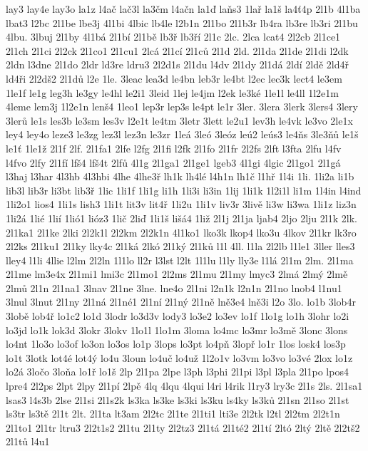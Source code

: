 lay3
lay4e
lay3o
la1z
l4ač
lač3l
la3čm
l4ačn
la1ď
laňs3
1lař
la1š
la4ť4p
2l1b
4l1ba
lbat3
l2bc
2l1be
lbe3j
4l1bi
4lbic
lb4le
l2b1n
2l1bo
2l1b3r
lb4ra
lb3re
lb3ri
2l1bu
4lbu.
3lbuj
2l1by
4l1bá
2l1bí
2l1bě
lb3ř
lb3ří
2l1c
2lc.
2lca
lcat4
2l2cb
2l1ce1
2l1ch
2l1ci
2l2ck
2l1co1
2l1cu1
2lcá
2l1cí
2l1ců
2l1d
2ld.
2l1da
2l1de
2l1di
l2dk
2ldn
l3dne
2l1do
2ldr
ld3re
ldru3
2l2d1s
2l1du
l4dv
2l1dy
2l1dá
2ldí
2ldě
2ld4ř
ld4ři
2l2dš2
2l1dů
l2e
1le.
3leac
lea3d
le4bn
leb3r
le4bt
l2ec
lec3k
lect4
le3em
1le1f
le1g
leg3h
le3gy
le4hl
le2i1
3leid
1lej
le4jm
l2ek
le3ké
1le1l
le4ll
1l2e1m
4leme
lem3j
1l2e1n
lenš4
1leo1
lep3r
lep3s
le4pt
le1r
3ler.
3lera
3lerk
3lers4
3lery
3lerů
le1s
les3b
le3sm
les3v
l2e1t
le4tm
3letr
3lett
le2u1
lev3h
le4vk
le3vo
2le1x
ley4
ley4o
leze3
le3zg
lez3l
lez3n
le3zr
1leá
3leó
3leóz
leú2
leús3
le4ňs
3le3ňů
le1š
le1ť
1le1ž
2l1f
2lf.
2l1fa1
2lfe
l2fg
2l1fi
l2fk
2l1fo
2l1fr
2l2fs
2lft
l3fta
2lfu
l4fv
l4fvo
2lfy
2l1fí
lfš4
lfš4t
2lfů
4l1g
2l1ga1
2l1ge1
lgeb3
4l1gi
4lgic
2l1go1
2l1gá
l3haj
l3har
4l3hb
4l3hbi
4lhe
4lhe3ř
lh1k
lh4lé
l4h1n
lh1č
l1hř
1l4i
1li.
1li2a
li1b
lib3l
lib3r
li3bt
lib3ř
1lic
1li1f
1li1g
li1h
1li3i
li3in
1lij
1li1k
1l2i1l
li1m
1l4in
l4ind
1li2o1
lios4
1li1s
lish3
1li1t
lit3v
lit4ř
1li2u
1li1v
liv3r
3livě
li3w
li3wa
1li1z
liz3n
1li2á
1lié
1lií
1lió1
lióz3
1lič
2liď
1li1š
lišá4
1liž
2l1j
2l1ja
ljab4
2ljo
2lju
2l1k
2lk.
2l1ka1
2l1ke
2lki
2l2k1l
2l2km
2l2k1n
4l1ko1
lko3k
lkop4
lko3u
4lkov
2l1kr
lk3ro
2l2ks
2l1ku1
2l1ky
lky4c
2l1ká
2lkó
2l1ký
2l1ků
l1l
4ll.
l1la
2l2lb
l1le1
3ller
lles3
lley4
l1li
4llie
l2lm
2l2ln
1l1lo
ll2r
l3lst
l2lt
1l1lu
l1ly
lly3e
l1lá
2l1m
2lm.
2l1ma
2l1me
lm3e4x
2l1mi1
lmi3c
2l1mo1
2l2ms
2l1mu
2l1my
lmyc3
2lmá
2lmý
2lmě
2lmů
2l1n
2l1na1
3lnav
2l1ne
3lne.
lne4o
2l1ni
l2n1k
l2n1n
2l1no
lnob4
l1nu1
3lnul
3lnut
2l1ny
2l1ná
2l1né1
2l1ní
2l1ný
2l1ně
lně3e4
lně3i
l2o
3lo.
lo1b
3lob4r
3lobě
lob4ř
lo1c2
lo1d
3lodr
lo3d3v
lody3
lo3e2
lo3ev
lo1f
1lo1g
lo1h
3lohr
lo2i
lo3jd
lo1k
lok3d
3lokr
3lokv
1lo1l
1lo1m
3loma
lo4mc
lo3mr
lo3mě
3lonc
3lons
lo4nt
1lo3o
lo3of
lo3on
lo3os
lo1p
3lops
lo3pt
lo4pň
3lopř
lo1r
1los
losk4
los3p
lo1t
3lotk
lot4é
lot4ý
lo4u
3loun
lo4uč
lo4už
1l2o1v
lo3vm
lo3vo
lo3vé
2lox
lo1z
lo2á
3ločo
3loňa
lo1ř
lo1š
2lp
2l1pa
2lpe
l3ph
l3phi
2l1pi
l3pl
l3pla
2l1po
lpos4
lpre4
2l2ps
2lpt
2lpy
2l1pí
2lpě
4lq
4lqu
4lqui
l4ri
l4rik
l1ry3
lry3c
2l1s
2ls.
2l1sa1
lsas3
l4s3b
2lse
2l1si
2l1s2k
ls3ka
ls3ke
ls3ki
ls3ku
ls4ky
ls3ků
2l1sn
2l1so
2l1st
ls3tr
ls3tě
2l1t
2lt.
2l1ta
lt3am
2l2tc
2l1te
2l1ti1
lti3e
2l2tk
l2tl
2l2tm
2l2t1n
2l1to1
2l1tr
ltru3
2l2t1s2
2l1tu
2l1ty
2l2tz3
2l1tá
2l1té2
2l1tí
2ltó
2ltý
2ltě
2l2tš2
2l1tů
l4u1
